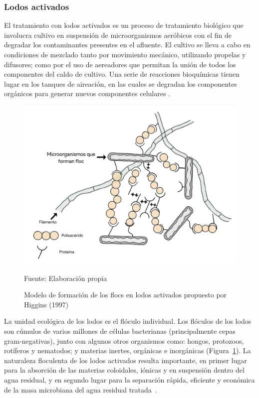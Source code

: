 \subsubsection*{Lodos activados}
El tratamiento con lodos activados es un proceso de tratamiento biológico que involucra cultivo en suspensión de microorganismos aeróbicos con el fin de degradar los contaminantes presentes en el afluente. El cultivo se lleva a cabo en condiciones de mezclado tanto por movimiento mecánico, utilizando propelas y difusores; como por el uso de aereadores que permitan la unión de todos los componentes del caldo de cultivo. Una serie de reacciones bioquímicas tienen lugar en los tanques de aireación, en las cuales se degradan los componentes orgánicos para generar nuevos componentes celulares \emph{\citep{ashok16}}.\\
	\begin{figure}[h]
		\centering
		\includegraphics[scale=0.18]{Floculo.png}
		\caption{Modelo de formación de los flocs en lodos activados propuesto por Higgins (1997)}
		\small{Fuente: Elaboración propia}
		\label{fig:modfloc}
	\end{figure}
La unidad ecológica de los lodos es el flóculo individual. Los flóculos de los lodos son cúmulos de varios millones de células bacterianas (principalmente cepas gram-negativas), junto con algunos otros organismos como: hongos, protozoos, rotíferos y nematodos; y materias inertes, orgánicas e inorgánicas (Figura~\ref{fig:modfloc}). La naturaleza floculenta de los lodos activados resulta importante, en primer lugar para la absorción de las materias coloidales, iónicas y en suspensión dentro del agua residual, y en segundo lugar para la separación rápida, eficiente y económica de la masa microbiana del agua residual tratada~\emph{\citep{ashok16}}.\\ 
